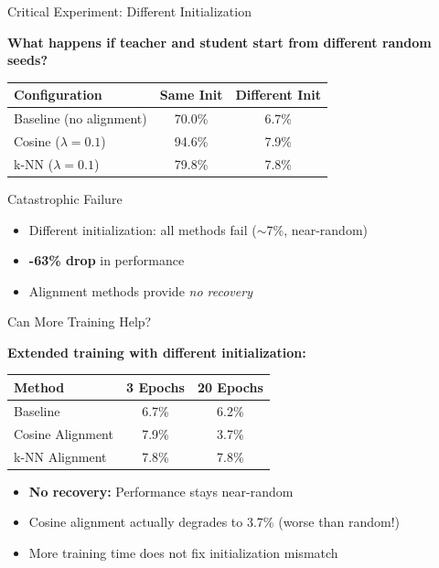 \documentclass{beamer}
\begin{document}
\begin{frame}{Critical Experiment: Different Initialization}

\textbf{What happens if teacher and student start from different random seeds?}

\vspace{1em}

\begin{table}
\centering
\begin{tabular}{lcc}
\toprule
Configuration & Same Init & Different Init \\
\midrule
Baseline (no alignment) & 70.0\% & \alert{6.7\%} \\
Cosine ($\lambda=0.1$) & 94.6\% & \alert{7.9\%} \\
k-NN ($\lambda=0.1$) & 79.8\% & \alert{7.8\%} \\
\bottomrule
\end{tabular}
\end{table}

\vspace{1em}

\begin{alertblock}{Catastrophic Failure}
\begin{itemize}
    \item Different initialization: all methods fail ($\sim$7\%, near-random)
    \item \textbf{-63\% drop} in performance
    \item Alignment methods provide \emph{no recovery}
\end{itemize}
\end{alertblock}

\end{frame}

\begin{frame}{Can More Training Help?}

\textbf{Extended training with different initialization:}

\vspace{1em}

\begin{table}
\centering
\begin{tabular}{lcc}
\toprule
Method & 3 Epochs & 20 Epochs \\
\midrule
Baseline & 6.7\% & 6.2\% \\
Cosine Alignment & 7.9\% & \alert{3.7\%} \\
k-NN Alignment & 7.8\% & 7.8\% \\
\bottomrule
\end{tabular}
\end{table}

\vspace{1em}

\begin{itemize}
    \item \textbf{No recovery:} Performance stays near-random
    \item \alert{Cosine alignment actually degrades to 3.7\%} (worse than random!)
    \item More training time does not fix initialization mismatch
\end{itemize}

\end{frame}
\end{document}
